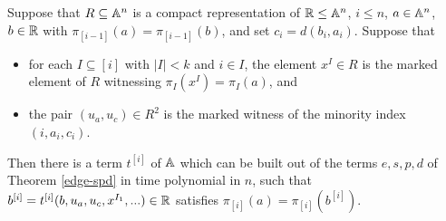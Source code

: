 \documentclass[letterpaper,11pt]{article}
\begin{document}
\begin{lem}\label{compact-rep-filter} Suppose that $R \subseteq \mathbb{A}^n$ is a compact representation of $\mathbb{R} \le \mathbb{A}^n$, $i \le n$, $a \in \mathbb{A}^n$, $b \in \mathbb{R}$ with $\pi_{[i-1]}(a) = \pi_{[i-1]}(b)$, and set $c_i = d(b_i, a_i)$. Suppose that
\begin{itemize}
\item for each $I \subseteq [i]$ with $|I| < k$ and $i \in I$, the element $x^I \in R$ is the marked element of $R$ witnessing $\pi_I(x^I) = \pi_I(a)$, and

\item the pair $(u_a,u_c) \in R^2$ is the marked witness of the minority index $(i,a_i,c_i)$.
\end{itemize}
Then there is a term $t^{[i]}$ of $\mathbb{A}$ which can be built out of the terms $e,s,p,d$ of Theorem \ref{edge-spd} in time polynomial in $n$, such that $b^{[i]} = t^{[i]}(b,u_a,u_c,x^{I_1}, ...) \in \mathbb{R}$ satisfies $\pi_{[i]}(a) = \pi_{[i]}(b^{[i]})$.
\end{lem}
\end{document}
